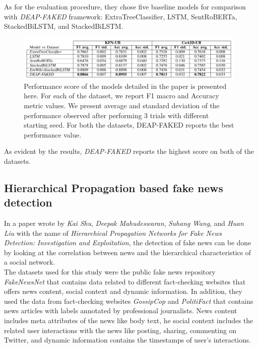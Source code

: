 \documentclass[10pt, english]{report}
\begin{document}
As for the evaluation procedure, they chose five baseline models for comparison with \textit{DEAP-FAKED} framework: ExtraTreeClassifier, LSTM, SentRoBERTa, StackedBiLSTM, and StackedBiLSTM.

\begin{figure}[H]
	\centering
	\includegraphics[scale=0.4]{img/deap_faked_evaluation.png}
	\caption{Performance score of the models detailed in the paper is presented here. For each of the dataset, we report F1 macro and Accuracy metric values. We present average and standard deviation of the performance observed after performing 3 trials with different starting seed. For both the datasets, DEAP-FAKED reports the best performance value. \cite{mayank2021deap}}
\end{figure}

As evident by the results, \textit{DEAP-FAKED} reports the highest score on both of the datasets.


\subsection{Hierarchical Propagation based fake news detection \cite{shu2020hierarchical}}
In a paper wrote by \textit{Kai Shu}, \textit{Deepak Mahudeswaran}, \textit{Suhang Wang}, and \textit{Huan Liu} with the name of \textit{Hierarchical Propagation Networks for Fake News Detection: Investigation and Exploitation}, the detection of fake news can be done by looking at the correlation between news and the hierarchical characteristics of a social network.\\

The datasets used for this study were the public fake news repository \textit{FakeNewsNet} \cite{shu2018fakenewsnet} that contains data related to different fact-checking websites that offers news content, social context and dynamic information. In addition, they used the data from fact-checking websites \textit{GossipCop} and \textit{PolitiFact} that contains news articles with labels annotated by professional journalists. News content includes meta attributes of the news like body text, he social context includes the related user interactions with the news like posting, sharing, commenting on Twitter, and dynamic information contains the timestamps of user's interactions.\\
\end{document}
